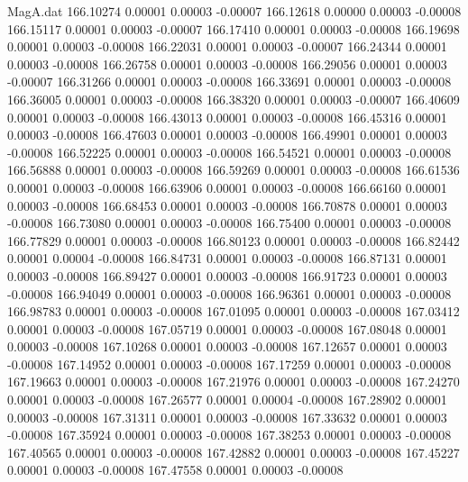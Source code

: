 \begin{filecontents}{MagA.dat}
 166.10274    0.00001    0.00003   -0.00007
 166.12618    0.00000    0.00003   -0.00008
 166.15117    0.00001    0.00003   -0.00007
 166.17410    0.00001    0.00003   -0.00008
 166.19698    0.00001    0.00003   -0.00008
 166.22031    0.00001    0.00003   -0.00007
 166.24344    0.00001    0.00003   -0.00008
 166.26758    0.00001    0.00003   -0.00008
 166.29056    0.00001    0.00003   -0.00007
 166.31266    0.00001    0.00003   -0.00008
 166.33691    0.00001    0.00003   -0.00008
 166.36005    0.00001    0.00003   -0.00008
 166.38320    0.00001    0.00003   -0.00007
 166.40609    0.00001    0.00003   -0.00008
 166.43013    0.00001    0.00003   -0.00008
 166.45316    0.00001    0.00003   -0.00008
 166.47603    0.00001    0.00003   -0.00008
 166.49901    0.00001    0.00003   -0.00008
 166.52225    0.00001    0.00003   -0.00008
 166.54521    0.00001    0.00003   -0.00008
 166.56888    0.00001    0.00003   -0.00008
 166.59269    0.00001    0.00003   -0.00008
 166.61536    0.00001    0.00003   -0.00008
 166.63906    0.00001    0.00003   -0.00008
 166.66160    0.00001    0.00003   -0.00008
 166.68453    0.00001    0.00003   -0.00008
 166.70878    0.00001    0.00003   -0.00008
 166.73080    0.00001    0.00003   -0.00008
 166.75400    0.00001    0.00003   -0.00008
 166.77829    0.00001    0.00003   -0.00008
 166.80123    0.00001    0.00003   -0.00008
 166.82442    0.00001    0.00004   -0.00008
 166.84731    0.00001    0.00003   -0.00008
 166.87131    0.00001    0.00003   -0.00008
 166.89427    0.00001    0.00003   -0.00008
 166.91723    0.00001    0.00003   -0.00008
 166.94049    0.00001    0.00003   -0.00008
 166.96361    0.00001    0.00003   -0.00008
 166.98783    0.00001    0.00003   -0.00008
 167.01095    0.00001    0.00003   -0.00008
 167.03412    0.00001    0.00003   -0.00008
 167.05719    0.00001    0.00003   -0.00008
 167.08048    0.00001    0.00003   -0.00008
 167.10268    0.00001    0.00003   -0.00008
 167.12657    0.00001    0.00003   -0.00008
 167.14952    0.00001    0.00003   -0.00008
 167.17259    0.00001    0.00003   -0.00008
 167.19663    0.00001    0.00003   -0.00008
 167.21976    0.00001    0.00003   -0.00008
 167.24270    0.00001    0.00003   -0.00008
 167.26577    0.00001    0.00004   -0.00008
 167.28902    0.00001    0.00003   -0.00008
 167.31311    0.00001    0.00003   -0.00008
 167.33632    0.00001    0.00003   -0.00008
 167.35924    0.00001    0.00003   -0.00008
 167.38253    0.00001    0.00003   -0.00008
 167.40565    0.00001    0.00003   -0.00008
 167.42882    0.00001    0.00003   -0.00008
 167.45227    0.00001    0.00003   -0.00008
 167.47558    0.00001    0.00003   -0.00008

\end{filecontents}
